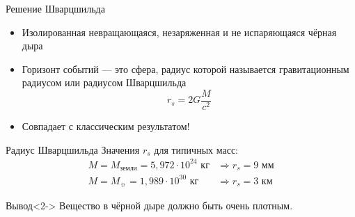 \documentclass[usenames,dvipsnames,pdftex,unicode,hidelinks]{beamer}
\begin{document}
  \begin{frame}{Решение Шварцшильда}
    \begin{itemize}
      \item<1-> Изолированная невращающаяся, незаряженная и не испаряющаяся чёрная дыра
      \item<2-> Горизонт событий — это сфера, радиус которой называется гравитационным радиусом или радиусом Шварцшильда
      \[
        \boxed{
          r_s = 2G\frac{M}{c^2}
        }
      \]
    \item<3-> \alert{Совпадает} с классическим результатом!
    \end{itemize}
  \end{frame}

  \begin{frame}{Радиус Шварцшильда}
    Значения $r_s$ для типичных масс:
    \begin{eqnarray*}
      M = M_{\text{земли}} = 5,972\cdot 10^{24} \text{ кг} & \Rightarrow r_s = 9 \text{ мм} \\
      M = M_{\sun} = 1,989\cdot 10^{30} \text{ кг} & \Rightarrow r_s = 3 \text{ км}
    \end{eqnarray*}
    \begin{block}{Вывод}<2->
      Вещество в чёрной дыре должно быть \alert{очень плотным}.
    \end{block}
  \end{frame}
\end{document}
